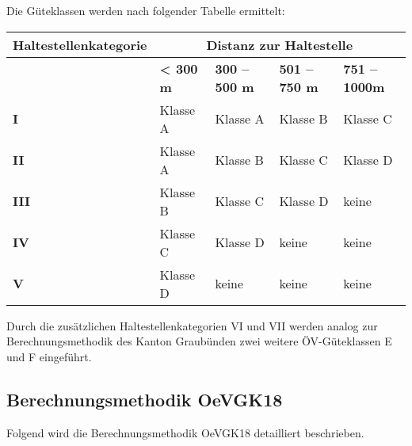\begin{itquote}
Die Güteklassen werden nach folgender Tabelle ermittelt:
\begin{table}[ht]
    \centering
    \begin{itquote}
    \begin{tabular}[c]{l p{2.2cm} p{2.2cm} p{2.2cm} p{2.2cm}}
        \toprule
        \textbf{Haltestellenkategorie}
                                & \multicolumn{4}{c}{\textbf{Distanz zur Haltestelle}}\\
        \midrule
        \textbf{}
                                & \textbf{< 300 m}
                                & \textbf{300 -- 500 m}
                                & \textbf{501 -- 750 m}
                                & \textbf{751 -- 1000m}\\
        \textbf{I}
                                & Klasse A
                                & Klasse A
                                & Klasse B
                                & Klasse C\\
        \textbf{II}
                                & Klasse A
                                & Klasse B
                                & Klasse C
                                & Klasse D\\
        \textbf{III}
                                & Klasse B
                                & Klasse C
                                & Klasse D
                                & keine\\
        \textbf{IV}
                                & Klasse C
                                & Klasse D
                                & keine
                                & keine\\
        \textbf{V}
                                & Klasse D
                                & keine
                                & keine
                                & keine\\
        \bottomrule
    \end{tabular}
    \end{itquote}
\end{table}
\end{itquote}

Durch die zusätzlichen Haltestellenkategorien VI und VII werden analog zur Berechnungsmethodik des Kanton Graubünden zwei weitere ÖV-Güteklassen E und F eingeführt.

\subsection{Berechnungsmethodik OeVGK18}
\label{Berechnungsmethodik OeVGK18}
Folgend wird die Berechnungsmethodik \gls{OeVGK18} detailliert beschrieben.

